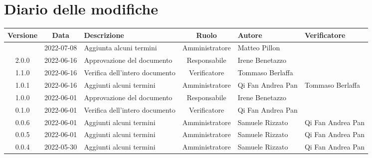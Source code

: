 \section*{Diario delle modifiche}
	\begin{center}
	\renewcommand{\arraystretch}{1.8} %
	\begin{longtable}{ |c|c|p{8em}|c|m{5em}|m{6em}| }
	\hline
	\textbf{Versione} & \textbf{Data} & \textbf{Descrizione} &  \textbf{Ruolo} &  \textbf{Autore} & \textbf{Verificatore}\\ %
    \hline
     & 2022-07-08 & Aggiunta alcuni termini & Amministratore & Matteo \newline Pillon & \\
	\hline
    2.0.0 & 2022-06-16 & Approvazione del documento & Responsabile & Irene \newline Benetazzo & \\
	\hline
	1.1.0 & 2022-06-16 & Verifica dell'intero documento & Verificatore & Tommaso \newline Berlaffa & \\
	\hline
	1.0.1 & 2022-06-16 & Aggiunti alcuni termini & Amministratore & Qi Fan \newline Andrea Pan &  Tommaso \newline Berlaffa \\
	\hline %
	1.0.0 & 2022-06-01 & Approvazione del documento & Responsabile & Irene \newline Benetazzo & \\
	\hline
	0.1.0 & 2022-06-01 & Verifica dell'intero documento & Verificatore & Qi Fan \newline Andrea Pan & \\
	\hline
	0.0.6 & 2022-06-01 & Aggiunti alcuni termini & Amministratore & Samuele \newline Rizzato &Qi Fan \newline Andrea Pan \\
	\hline
	0.0.5 & 2022-06-01 & Aggiunti alcuni termini & Amministratore & Samuele \newline Rizzato &Qi Fan \newline Andrea Pan \\
	\hline
	0.0.4 & 2022-05-30 & Aggiunti alcuni termini & Amministratore & Samuele \newline Rizzato & Qi Fan \newline Andrea Pan\\

\end{longtable}
\end{center}

